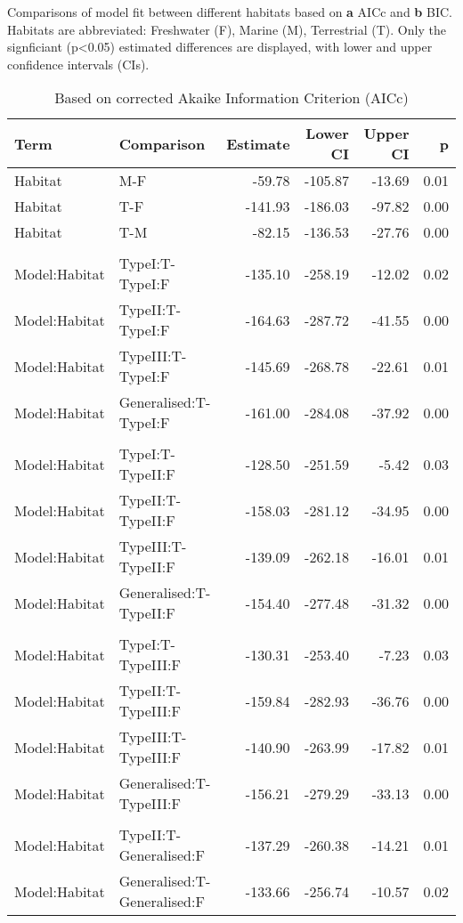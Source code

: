 \documentclass[11pt]{article}
\begin{document}
\begin{table}[ht]
    \caption{Comparisons of model fit between different habitats based on \textbf{a} AICc and \textbf{b} BIC. Habitats are abbreviated: Freshwater (F), Marine (M), Terrestrial (T). Only the signficiant (p\textless0.05) estimated differences are displayed, with lower and upper confidence intervals (CIs).} \label{tab:three_tables}
    
    \begin{subtable}{1\textwidth}
    \centering
        \caption{Based on corrected Akaike Information Criterion (AICc)}\label{tab:sub_first}
\begin{tabular}{llrrrr}
    \toprule
   {\textbf{Term}} & {\textbf{Comparison}} & {\textbf{Estimate}} & {\textbf{Lower CI}} & {\textbf{Upper CI}} & {\textbf{p}} \\ 
    \midrule
    Habitat & M-F & -59.78 & -105.87 & -13.69 & 0.01 \\ 
    Habitat & T-F & -141.93 & -186.03 & -97.82 & 0.00 \\ 
    Habitat & T-M & -82.15 & -136.53 & -27.76 & 0.00 \\
    \\
    Model:Habitat & TypeI:T-TypeI:F & -135.10 & -258.19 & -12.02 & 0.02 \\ 
    Model:Habitat & TypeII:T-TypeI:F & -164.63 & -287.72 & -41.55 & 0.00 \\ 
    Model:Habitat & TypeIII:T-TypeI:F & -145.69 & -268.78 & -22.61 & 0.01 \\ 
    Model:Habitat & Generalised:T-TypeI:F & -161.00 & -284.08 & -37.92 & 0.00 \\
    \\ 
    Model:Habitat & TypeI:T-TypeII:F & -128.50 & -251.59 & -5.42 & 0.03 \\ 
    Model:Habitat & TypeII:T-TypeII:F & -158.03 & -281.12 & -34.95 & 0.00 \\ 
    Model:Habitat & TypeIII:T-TypeII:F & -139.09 & -262.18 & -16.01 & 0.01 \\ 
    Model:Habitat & Generalised:T-TypeII:F & -154.40 & -277.48 & -31.32 & 0.00 \\ 
    \\
    Model:Habitat & TypeI:T-TypeIII:F & -130.31 & -253.40 & -7.23 & 0.03 \\ 
    Model:Habitat & TypeII:T-TypeIII:F & -159.84 & -282.93 & -36.76 & 0.00 \\ 
    Model:Habitat & TypeIII:T-TypeIII:F & -140.90 & -263.99 & -17.82 & 0.01 \\ 
    Model:Habitat & Generalised:T-TypeIII:F & -156.21 & -279.29 & -33.13 & 0.00 \\
    \\
    Model:Habitat & TypeII:T-Generalised:F & -137.29 & -260.38 & -14.21 & 0.01 \\
    Model:Habitat & Generalised:T-Generalised:F & -133.66 & -256.74 & -10.57 & 0.02 \\ 
     \bottomrule
  \end{tabular}
\end{subtable}


\end{table}
\end{document}
